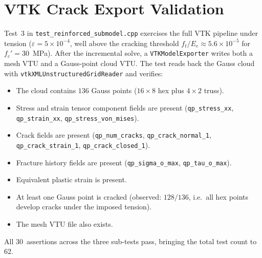 \section{VTK Crack Export Validation}
\label{sec:reinf-vtk-validation}

Test~3 in \texttt{test\_reinforced\_submodel.cpp} exercises the full VTK
pipeline under tension ($\varepsilon = 5 \times 10^{-4}$, well above
the cracking threshold
$f_t/E_e \approx 5.6 \times 10^{-5}$ for $f_c' = 30$~MPa).  After the
incremental solve, a \texttt{VTKModelExporter} writes both a mesh VTU
and a Gauss-point cloud VTU.  The test reads back the Gauss cloud with
\texttt{vtkXMLUnstructuredGridReader} and verifies:

\begin{itemize}
  \item The cloud contains $136$ Gauss points ($16 \times 8$ hex
        plus $4 \times 2$ truss).
  \item Stress and strain tensor component fields are present
        (\texttt{qp\_stress\_xx}, \texttt{qp\_strain\_xx},
         \texttt{qp\_stress\_von\_mises}).
  \item Crack fields are present (\texttt{qp\_num\_cracks},
        \texttt{qp\_crack\_normal\_1}, \texttt{qp\_crack\_strain\_1},
        \texttt{qp\_crack\_closed\_1}).
  \item Fracture history fields are present (\texttt{qp\_sigma\_o\_max},
        \texttt{qp\_tau\_o\_max}).
  \item Equivalent plastic strain is present.
  \item At least one Gauss point is cracked (observed: $128/136$, i.e.\ all
        hex points develop cracks under the imposed tension).
  \item The mesh VTU file also exists.
\end{itemize}

All 30~assertions across the three sub-tests pass, bringing the total
test count to 62.
